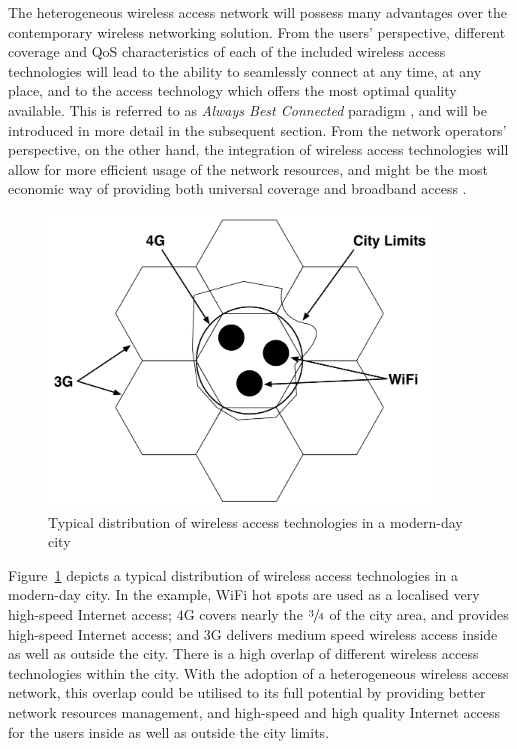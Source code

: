 The heterogeneous wireless access network will possess many advantages over the contemporary wireless networking solution. From the users' perspective, different coverage and QoS characteristics of each of the included wireless access technologies will lead to the ability to seamlessly connect at any time, at any place, and to the access technology which offers the most optimal quality available. This is referred to as \emph{Always Best Connected} paradigm \cite{ABC03}, and will be introduced in more detail in the subsequent section. From the network operators' perspective, on the other hand, the integration of wireless access technologies will allow for more efficient usage of the network resources, and might be the most economic way of providing both universal coverage and broadband access \cite{HossainBeaubrun09}.

\begin{figure}[t]
    \centering
    \includegraphics[width=4in]{Intelligent/Figures/wireless_city}
    \caption{Typical distribution of wireless access technologies in a modern-day city}
    \label{fig:wireless_city_intelligent}
\end{figure}

Figure~\ref{fig:wireless_city_intelligent} depicts a typical distribution of wireless access technologies in a modern-day city. In the example, WiFi hot spots are used as a localised very high-speed Internet access; 4G covers nearly the $\sfrac{3}{4}$ of the city area, and provides high-speed Internet access; and 3G delivers medium speed wireless access inside as well as outside the city. There is a high overlap of different wireless access technologies within the city. With the adoption of a heterogeneous wireless access network, this overlap could be utilised to its full potential by providing better network resources management, and high-speed and high quality Internet access for the users inside as well as outside the city limits.

